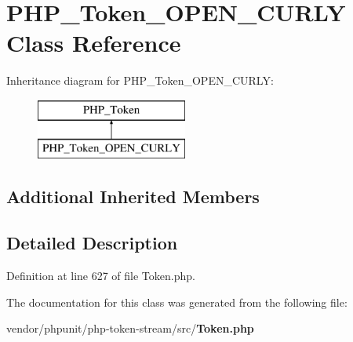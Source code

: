 \section{P\+H\+P\+\_\+\+Token\+\_\+\+O\+P\+E\+N\+\_\+\+C\+U\+R\+L\+Y Class Reference}
\label{class_p_h_p___token___o_p_e_n___c_u_r_l_y}
Inheritance diagram for P\+H\+P\+\_\+\+Token\+\_\+\+O\+P\+E\+N\+\_\+\+C\+U\+R\+L\+Y\+:\begin{figure}[H]
\begin{center}
\leavevmode
\includegraphics[height=2.000000cm]{class_p_h_p___token___o_p_e_n___c_u_r_l_y}
\end{center}
\end{figure}
\subsection*{Additional Inherited Members}


\subsection{Detailed Description}


Definition at line 627 of file Token.\+php.



The documentation for this class was generated from the following file\+:\begin{DoxyCompactItemize}
\item 
vendor/phpunit/php-\/token-\/stream/src/{\bf Token.\+php}\end{DoxyCompactItemize}
